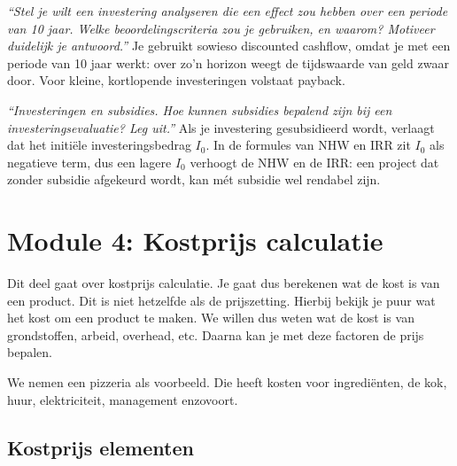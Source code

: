 \documentclass[a4paper,11pt]{article}
\begin{document}
\begin{examenbox}
    \textit{``Stel je wilt een investering analyseren die een effect zou hebben over een periode van 10 jaar.
        Welke beoordelingscriteria zou je gebruiken, en waarom? Motiveer duidelijk je antwoord.''}
    Je gebruikt sowieso discounted cashflow, omdat je met een periode van 10 jaar werkt: over zo'n horizon
    weegt de tijdswaarde van geld zwaar door. Voor kleine, kortlopende investeringen volstaat payback.
\end{examenbox}

\begin{examenbox}
    \textit{``Investeringen en subsidies. Hoe kunnen subsidies bepalend zijn bij een investeringsevaluatie? Leg uit.''}
    Als je investering gesubsidieerd wordt, verlaagt dat het initiële investeringsbedrag $I_0$.
    In de formules van NHW en IRR zit $I_0$ als negatieve term, dus een lagere $I_0$ verhoogt de NHW
    en de IRR: een project dat zonder subsidie afgekeurd wordt, kan mét subsidie wel rendabel zijn.
\end{examenbox}


\section{Module 4: Kostprijs calculatie}

Dit deel gaat over kostprijs calculatie. Je gaat dus berekenen wat de kost is van een product.
Dit is niet hetzelfde als de prijszetting. Hierbij bekijk je puur wat het kost om een product te maken.
We willen dus weten wat de kost is van grondstoffen, arbeid, overhead, etc.
Daarna kan je met deze factoren de prijs bepalen.
\newline

We nemen een pizzeria als voorbeeld.
Die heeft kosten voor ingrediënten, de kok, huur, elektriciteit, management enzovoort.

\subsection{Kostprijs elementen}
\end{document}

